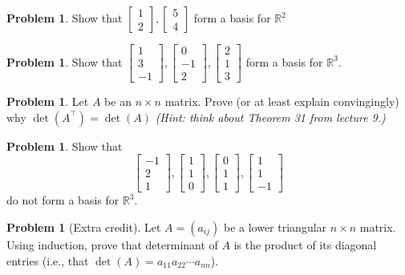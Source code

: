 \documentclass[10pt]{article}
\theoremstyle{definition}
\newtheorem{problem}[theorem]{Problem}
\newcommand{\1}[1]{\textbf{1}_{\left[#1\right]}} %
\def\R{\mathbb{R}} %
\begin{document}
\begin{problem}
  Show that $
  \begin{bmatrix}
    1\\2
  \end{bmatrix},
  \begin{bmatrix}
    5\\4
  \end{bmatrix}
  $
  form a basis for $\R^{2}$
\end{problem}

\begin{problem}
  Show that $
  \begin{bmatrix}
    1\\3\\-1
  \end{bmatrix},
  \begin{bmatrix}
    0\\-1\\2
  \end{bmatrix},
  \begin{bmatrix}
    2\\1\\3
  \end{bmatrix}
  $
  form a basis for $\R^{3}$.
\end{problem}



\begin{problem}
  Let $A$ be an $n\times n$ matrix. Prove (or at least explain convingingly)
  why $\det(A^{\top})= \det(A)$
  \textit{(Hint: think about Theorem 31 from lecture 9.)}
\end{problem}


\begin{problem}
  Show that
  \begin{equation*}
    \begin{bmatrix}
      -1\\2\\1
    \end{bmatrix},
    \begin{bmatrix}
      1\\1\\0
    \end{bmatrix},
    \begin{bmatrix}
      0\\1\\1
    \end{bmatrix},
    \begin{bmatrix}
      1\\1\\-1
    \end{bmatrix}
  \end{equation*}
  do not form a basis for $\R^{3}$.
\end{problem}



\begin{problem}[Extra credit]
  Let $A = (a_{ij})$ be a lower triangular $n\times n$ matrix. Using
  induction, prove that determinant of $A$ is the product of its diagonal
  entries (i.e., that $\det(A) = a_{11}a_{22}\cdots a_{nn}$).
\end{problem}
\end{document}
